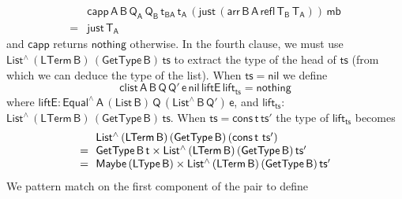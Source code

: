 \documentclass[sigplan,10pt]{acmart}
\begin{document}
\[\begin{array}{ll}
 & \!\!\mathsf{capp\, A \,B \, Q_A \, Q_B \, t_{BA}\, t_A \, (just \,
  (arr\, B \,A\, refl\, T_B\, T_A))\, mb}\\ 
= & \!\!\mathsf{just\, T_A}
\end{array}\]
and $\mathsf{capp}$ returns $\mathsf{nothing}$ otherwise.  In the
fourth clause, we must use $\mathsf{List^{\wedge}\, (LTerm\, B)\,
  (GetType\, B)\, ts}$ to extract the type of the head of
$\mathsf{ts}$ (from which we can deduce the type of the list). When
$\mathsf{ts} = \mathsf{nil}$ we define \[\mathsf{clist\, A\, B\, Q\,
  Q'\, e\, nil \, liftE\, lift_{ts} = nothing}\] where
$\mathsf{liftE : Equal^{\wedge}\, A\, (List\,B) \, Q\,
  (List^{\wedge}\, B\, Q')\, e}$, and $\mathsf{lift_{ts} :}$\\
$\mathsf{List^{\wedge}\, (LTerm\, B)\, (GetType\, B)\, ts}$.  When
$\mathsf{ts} = \mathsf{cons\,t\,ts'}$
the type of $\mathsf{lift_{ts}}$ becomes
\[\begin{array}{ll}
& \!\!\mathsf{List^{\wedge}\, (LTerm\, B)\, (GetType\, B)\, (cons\, t}$
$\mathsf{ts')}\\
= & \!\!\mathsf{GetType\, B\, t \times List^{\wedge}\, (LTerm\, B)\,
  (GetType\, B)\, ts'}\\
= & \!\! \mathsf{Maybe\, (LType\, B) \times List^{\wedge}\, (LTerm\, B)\,
  (GetType\, B)\, ts'}
\end{array}\] We pattern match on the first component
of the pair to define
\end{document}
